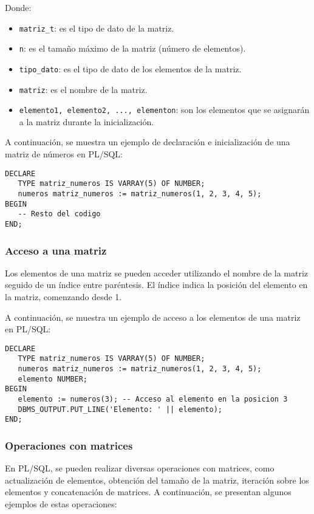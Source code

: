 \documentclass[executivepaper]{article}
\begin{document}
Donde:
\begin{itemize}
   \item \texttt{matriz\_t}: es el tipo de dato de la matriz.
   \item \texttt{n}: es el tamaño máximo de la matriz (número de elementos).
   \item \texttt{tipo\_dato}: es el tipo de dato de los elementos de la matriz.
   \item \texttt{matriz}: es el nombre de la matriz.
   \item \texttt{elemento1, elemento2, ..., elementon}: son los elementos que se asignarán a la matriz durante la inicialización.
\end{itemize}

A continuación, se muestra un ejemplo de declaración e inicialización de una matriz de números en PL/SQL:

\begin{lstlisting}
DECLARE
   TYPE matriz_numeros IS VARRAY(5) OF NUMBER;
   numeros matriz_numeros := matriz_numeros(1, 2, 3, 4, 5);
BEGIN
   -- Resto del codigo
END;
\end{lstlisting}

\subsubsection*{Acceso a una matriz}

Los elementos de una matriz se pueden acceder utilizando el nombre de la matriz seguido de un índice entre paréntesis. El índice indica la posición del elemento en la matriz, comenzando desde 1.

A continuación, se muestra un ejemplo de acceso a los elementos de una matriz en PL/SQL:

\begin{lstlisting}
DECLARE
   TYPE matriz_numeros IS VARRAY(5) OF NUMBER;
   numeros matriz_numeros := matriz_numeros(1, 2, 3, 4, 5);
   elemento NUMBER;
BEGIN
   elemento := numeros(3); -- Acceso al elemento en la posicion 3
   DBMS_OUTPUT.PUT_LINE('Elemento: ' || elemento);
END;
\end{lstlisting}

\subsubsection*{Operaciones con matrices}

En PL/SQL, se pueden realizar diversas operaciones con matrices, como actualización de elementos, obtención del tamaño de la matriz, iteración sobre los elementos y concatenación de matrices. A continuación, se presentan algunos ejemplos de estas operaciones:
\end{document}
